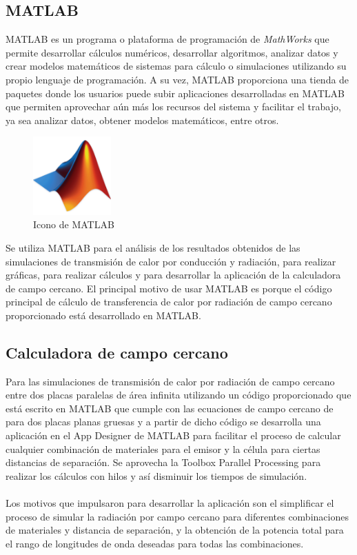 \subsection{MATLAB}
MATLAB es un programa o plataforma de programación de \textit{MathWorks} que permite desarrollar cálculos numéricos, desarrollar algoritmos, analizar datos y crear modelos matemáticos de sistemas para cálculo o simulaciones utilizando su propio lenguaje de programación. A su vez, MATLAB proporciona una tienda de paquetes donde los usuarios puede subir aplicaciones desarrolladas en MATLAB que permiten aprovechar aún más los recursos del sistema y facilitar el trabajo, ya sea analizar datos, obtener modelos matemáticos, entre otros.\\
\begin{figure}[H]
	\centering
		\includegraphics[width=3cm]{figuras/MatlabIcon.png}
	\caption{Icono de MATLAB}
	\label{fig:MatlabIcon}
\end{figure}
Se utiliza MATLAB para el análisis de los resultados obtenidos de las simulaciones de transmisión de calor por conducción y radiación, para realizar gráficas, para realizar cálculos y para desarrollar la aplicación de la calculadora de campo cercano. El principal motivo de usar MATLAB es porque el código principal de cálculo de transferencia de calor por radiación de campo cercano proporcionado está desarrollado en MATLAB.

\subsection{Calculadora de campo cercano}
Para las simulaciones de transmisión de calor por radiación de campo cercano entre dos placas paralelas de área infinita utilizando un código proporcionado que está escrito en MATLAB que cumple con las ecuaciones de campo cercano de \cite{nfTPV_equations} para dos placas planas gruesas y a partir de dicho código se desarrolla una aplicación en el App Designer de MATLAB para facilitar el proceso de calcular cualquier combinación de materiales para el emisor y la célula para ciertas distancias de separación. Se aprovecha la Toolbox Parallel Processing para realizar los cálculos con hilos y así disminuir los tiempos de simulación.\\\\
Los motivos que impulsaron para desarrollar la aplicación son el simplificar el proceso de simular la radiación por campo cercano para diferentes combinaciones de materiales y distancia de separación, y la obtención de la potencia total para el rango de longitudes de onda deseadas para todas las combinaciones.\\

